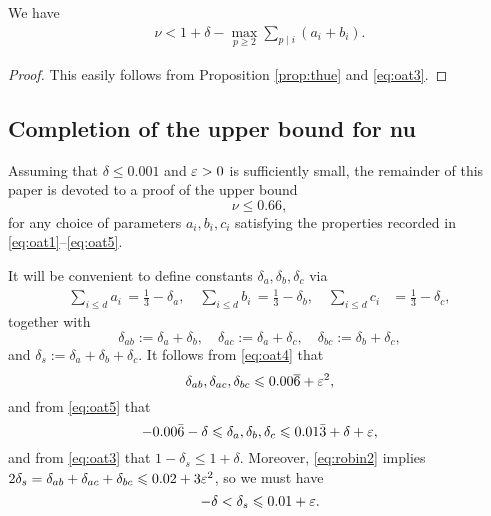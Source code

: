 \begin{proposition*}
We have
\begin{align*}
\nu < 1 +\delta- \max_{p\ge2}\sum_{p\mid i}(a_i+b_i).
\end{align*}
\end{proposition*}
\begin{proof}
This easily  follows from Proposition \ref{prop:thue} and \eqref{eq:oat3}.
\end{proof}




\subsection{Completion of the upper bound for nu}

Assuming that
 $\delta\leq 0.001$ and
$\varepsilon>0$ is sufficiently small,
the remainder of this paper is devoted to a proof of the upper bound
$$\nu \le 0.66,
$$
for any choice of parameters $a_i,b_i ,c_i$ satisfying the properties recorded in \eqref{eq:oat1}--\eqref{eq:oat5}.


It will be convenient to define constants $\delta_a,\delta_b,\delta_c$ via
\begin{align}\label{eq:ai1/3}
\sum_{i\leq d} a_i \, = \frac{1}{3}-\delta_a, \quad \sum_{i\leq d} b_i \, = \frac{1}{3}-\delta_b, \quad \sum_{i\leq d} c_i &= \frac{1}{3}-\delta_c,
\end{align}
together with
$$
\delta_{ab}:=\delta_a+\delta_b,\quad  \delta_{ac}:=\delta_a+\delta_c, \quad \delta_{bc}:=\delta_b+\delta_c,
$$
and $\delta_s := \delta_a+\delta_b+\delta_c$. It follows from \eqref{eq:oat4} that
\begin{equation}\label{eq:robin2}
\delta_{ab}, \delta_{ac}, \delta_{bc} \leqslant 0.00\overline{6} + \varepsilon^2,
\end{equation}
and from \eqref{eq:oat5} that
\begin{equation}\label{eq:robin1}
-0.00\bar 6 - \delta
\leqslant \delta_a,\delta_b,\delta_c \leqslant
0.01\bar3+\delta+\varepsilon,
\end{equation}
and from \eqref{eq:oat3} that
$
1-\delta_s\leq 1+\delta.
$
Moreover, \eqref{eq:robin2} implies $2\delta_s = \delta_{ab}+ \delta_{ac}+ \delta_{bc}\leqslant 0.02 + 3\varepsilon^2$, so we must have
\begin{equation}\label{eq:robin3}
-\delta <
\delta_s \leqslant 0.01+\varepsilon.
\end{equation}

